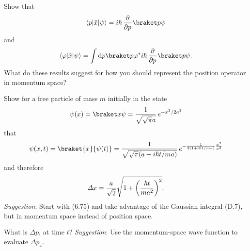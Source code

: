 \documentclass{../phys116}
\begin{document}
\begin{solution}
  \begin{problems}
  \item
  \item
  \item
  \end{problems}
\end{solution}

\begin{exercise}
  Show that
  \[
    \bra p \hat x \ket \psi = i \hbar \, \pdrv{}{p} \braket p \psi
  \]
  and
  \[
    \bra \varphi \hat x \ket \psi
    = \int \dif p \braket p \varphi^*
    i \hbar \, \pdrv{}{p} \braket p \psi.
  \]
  What do these results suggest for how you should represent the
  position operator in momentum space?
\end{exercise}

\begin{solution}
\end{solution}

\begin{exercise}
  \begin{problems}
  \item Show for a free particle of mass \(m\) initially in the state
    \[
      \psi(x) = \braket x \psi
      = \frac{1}{\sqrt{\sqrt \pi a}} \, e^{-x^2/2a^2}
    \]
    that
    \[
      \psi(x, t) = \braket{x}{\psi(t)}
      = \frac{1}{\sqrt{\sqrt \pi (a + i \hbar t/m a)}}
      \, e^{-\frac{1}{2 (1 + i \hbar t/m a)} \frac{x^2}{a^2}}
    \]
    and therefore
    \[
      \Delta x = \frac{a}{\sqrt 2}
      \sqrt{1 + \prn*{\frac{\hbar t}{m a^2}}^2}.
    \]
    \textit{Suggestion}: Start with (6.75) and take advantage of the
    Gaussian integral (D.7), but in momentum space instead of position
    space.
  \item What is \(\Delta p\), at time \(t\)?  \textit{Suggestion}: Use
    the momentum-space wave function to evaluate \(\Delta p_x\).
  \end{problems}
\end{exercise}

\begin{solution}
  \begin{problems}
  \item
  \item
  \end{problems}
\end{solution}
\end{document}
